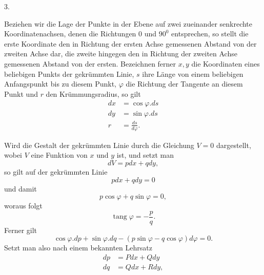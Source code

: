 \par{}%
\begin{center}3.\end{center}
\noindent\hspace*{1.2em}Beziehen wir die Lage der Punkte in der Ebene auf zwei zueinander senkrechte Koordinatenachsen, denen die Richtungen $0$ und $90^{0}$ entsprechen, so stellt die erste Koordinate den in Richtung der ersten Achse gemessenen Abstand von der zweiten Achse dar, die zweite hingegen den in Richtung der zweiten Achse gemessenen Abstand von der ersten. Bezeichnen ferner $x,y$ die Koordinaten eines beliebigen Punkts der gekrümmten Linie, $s$ ihre Länge von einem beliebigen Anfangspunkt bis zu diesem Punkt, $\varphi$ die Richtung der Tangente an diesem Punkt und $r$ den Krümmungsradius, so gilt
\[
\begin{aligned}
dx&=\cos\varphi.ds\\
dy&=\sin\varphi.ds\\
r&=\frac{ds}{d\varphi}.
\end{aligned}
\]

Wird die Gestalt der gekrümmten Linie durch die Gleichung $V=0$ dargestellt, wobei $V$ eine Funktion von $x$ und $y$ ist, und setzt man
\[
dV=pdx+qdy,
\]
so gilt auf der gekrümmten Linie
\[
pdx+qdy=0
\]
und damit
\[
p\cos\varphi+q\sin\varphi=0,
\]
woraus folgt
\[
\operatorname{tang}\varphi=-\frac pq.
\]
Ferner gilt
\[
\cos\varphi.dp+\sin\varphi.dq-(p\sin\varphi-q\cos\varphi)d\varphi=0.
\]
Setzt man also nach einem bekannten Lehrsatz
\[
\begin{aligned}
dp&=Pdx+Qdy\\
dq&=Qdx+Rdy,
\end{aligned}
\]

